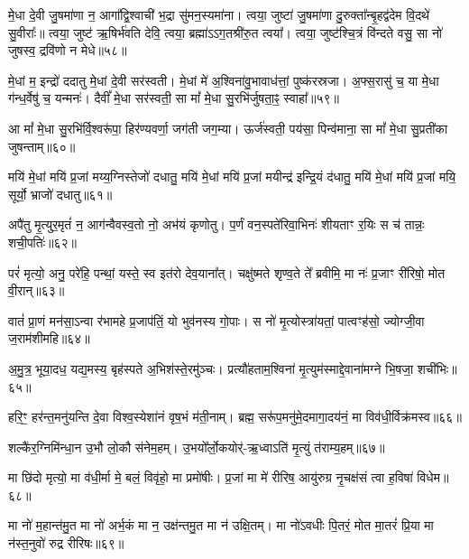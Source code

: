 मे॒धा दे॒वी जु॒षमा॑णा न॒ आगा᳚द्वि॒श्वाची॑ भ॒द्रा सु॑मन॒स्यमा॑ना। 
त्वया॒ जुष्टा॑ जु॒षमा॑णा दु॒रुक्ता᳚न्बृ॒हद्व॑देम वि॒दथे॑ सु॒वीराः᳚॥ 
त्वया॒ जुष्ट॑ ऋ॒षिर्भ॑वति देवि॒ त्वया॒ ब्रह्मा॑ऽऽग॒तश्री॑रु॒त त्वया᳚। 
त्वया॒ जुष्ट॑श्चि॒त्रं वि॑न्दते वसु॒ सा नो॑ जुषस्व॒ द्रवि॑णो न मेधे॥५८॥
\anuvakamend


मे॒धां म॒ इन्द्रो॑ ददातु मे॒धां दे॒वी सर॑स्वती। 
मे॒धां मे॑ अ॒श्विना॑वु॒भावाध॑त्तां॒ पुष्क॑रस्रजा। 
अ॒फ्स॒रासु॑ च॒ या मे॒धा ग॑न्ध॒र्वेषु॑ च॒ यन्मनः॑। 
दैवीं᳚ मे॒धा सर॑स्वती॒ सा मां᳚ मे॒धा सु॒रभि॑र्जुषता॒ꣴ॒ स्वाहा᳚॥५९॥
\anuvakamend


आ मां᳚ मे॒धा सु॒रभि॑र्वि॒श्वरू॑पा॒ हिर॑ण्यवर्णा॒ जग॑ती जग॒म्या। 
ऊर्ज॑स्वती॒ पय॑सा॒ पिन्व॑माना॒ सा मां᳚ मे॒धा सु॒प्रती॑का जुषन्ताम्॥६०॥ 
\anuvakamend

मयि॑ मे॒धां मयि॑ प्र॒जां मय्य॒ग्निस्तेजो॑ दधातु॒ मयि॑ मे॒धां मयि॑ प्र॒जां मयीन्द्र॑ इन्द्रि॒यं द॑धातु॒ मयि॑ मे॒धां मयि॑ प्र॒जां मयि॒ सूर्यो॒ भ्राजो॑ दधातु॥६१॥ 
\anuvakamend


अपै॑तु मृ॒त्युर॒मृतं॑ न॒ आग॑न्वैवस्व॒तो नो॒ अभ॑यं कृणोतु। 
प॒र्णं वन॒स्पते॑रिवा॒भिनः॑ शीयताꣳ र॒यिः स च॑ तान्नः॒ शची॒पतिः॑॥६२॥%
\anuvakamend

 परं॑ मृत्यो॒ अनु॒ परे॑हि॒ पन्थां॒ यस्ते॒ स्व इत॑रो देव॒याना᳚त्। 
 चक्षु॑ष्मते शृण्व॒ते ते᳚ ब्रवीमि॒ मा नः॑ प्र॒जाꣳ री॑रिषो॒ मोत वी॒रान्॥६३॥
 \anuvakamend
 
 वातं॑ प्रा॒णं मन॑सा॒ऽन्वा र॑भामहे प्र॒जाप॑तिं॒ यो भुव॑नस्य गो॒पाः। 
 स नो॑ मृ॒त्योस्त्रा॑यतां॒ पात्वꣳह॑सो॒ ज्योग्जी॒वा ज॒राम॑शीमहि॥६४॥
 \anuvakamend
 
 अ॒मु॒त्र॒ भूया॒दध॒ यद्य॒मस्य॒ बृह॑स्पते अ॒भिश॑स्ते॒रमु॑ञ्चः। 
 प्रत्यौ॑हताम॒श्विना॑ मृ॒त्युम॑स्माद्दे॒वाना॑मग्ने भि॒षजा॒ शची॑भिः॥६५॥
 \anuvakamend
 
 हरि॒ꣳ॒ हर॑न्त॒मनु॑यन्ति दे॒वा विश्व॒स्येशा॑नं वृष॒भं म॑ती॒नाम्। 
 ब्रह्म॒ सरू॑प॒मनु॑मे॒दमागा॒दय॑नं॒ मा विव॑धी॒र्विक्र॑मस्व॥६६॥
 \anuvakamend
 
 शल्कै॑र॒ग्निमि॑न्धा॒न उ॒भौ लो॒कौ स॑नेम॒हम्। 
 उ॒भयो᳚र्लो॒कयोर्॑-ऋ॒ध्वाऽति॑ मृ॒त्युं त॑राम्य॒हम्॥६७॥
\anuvakamend
 
मा छि॑दो मृत्यो॒ मा व॑धी॒र्मा मे॒ बलं॒ विवृ॑हो॒ मा प्रमो॑षीः। 
प्र॒जां मा मे॑ रीरिष॒ आयु॑रुग्र नृ॒चक्ष॑सं त्वा ह॒विषा॑ विधेम॥६८॥
\anuvakamend
 
मा नो॑ म॒हान्त॑मु॒त मा नो॑ अर्भ॒कं मा न॒ उक्ष॑न्तमु॒त मा न॑ उक्षि॒तम्। 
मा नो॑ऽवधीः पि॒तरं॒ मोत मा॒तरं॑ प्रि॒या मा न॑स्त॒नुवो॑ रुद्र रीरिषः॥६९॥
\anuvakamend

